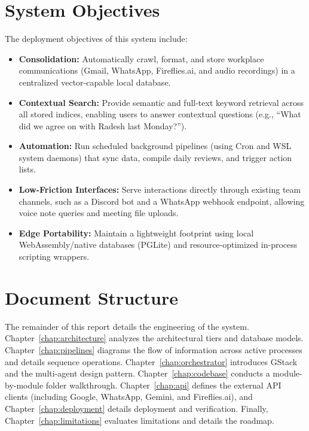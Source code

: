 \documentclass[12pt,a4paper]{report}
\begin{document}
\section{System Objectives}
The deployment objectives of this system include:
\begin{itemize}
    \item \textbf{Consolidation:} Automatically crawl, format, and store workplace communications (Gmail, WhatsApp, Fireflies.ai, and audio recordings) in a centralized vector-capable local database.
    \item \textbf{Contextual Search:} Provide semantic and full-text keyword retrieval across all stored indices, enabling users to answer contextual questions (e.g., ``What did we agree on with Radesh last Monday?'').
    \item \textbf{Automation:} Run scheduled background pipelines (using Cron and WSL system daemons) that sync data, compile daily reviews, and trigger action lists.
    \item \textbf{Low-Friction Interfaces:} Serve interactions directly through existing team channels, such as a Discord bot and a WhatsApp webhook endpoint, allowing voice note queries and meeting file uploads.
    \item \textbf{Edge Portability:} Maintain a lightweight footprint using local WebAssembly/native databases (PGLite) and resource-optimized in-process scripting wrappers.
\end{itemize}

\section{Document Structure}
The remainder of this report details the engineering of the system. Chapter~\ref{chap:architecture} analyzes the architectural tiers and database models. Chapter~\ref{chap:pipelines} diagrams the flow of information across active processes and details sequence operations. Chapter~\ref{chap:orchestrator} introduces GStack and the multi-agent design pattern. Chapter~\ref{chap:codebase} conducts a module-by-module folder walkthrough. Chapter~\ref{chap:api} defines the external API clients (including Google, WhatsApp, Gemini, and Fireflies.ai), and Chapter~\ref{chap:deployment} details deployment and verification. Finally, Chapter~\ref{chap:limitations} evaluates limitations and details the roadmap.

\end{document}

